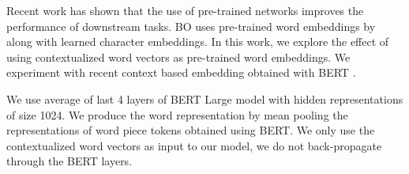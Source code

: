 \documentclass[11pt,a4paper]{article}
\begin{document}
Recent work has shown that the use of pre-trained networks improves the performance of downstream tasks. BO uses pre-trained word embeddings by  along with learned character embeddings. In this work, we explore the effect of using contextualized word vectors as pre-trained word embeddings. We experiment with recent context based embedding obtained with BERT \cite{devlin2018bert}. 



We use average of last 4 layers of BERT Large model with hidden representations of size 1024. We produce the word representation by mean pooling the representations of word piece tokens obtained using BERT. We only use the contextualized word vectors as input to our model, we do not back-propagate through the BERT layers. 
\end{document}
